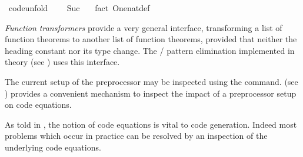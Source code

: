 \begin{isabellebody}
\begin{itemize}
\ {}code{}unfold{}{}\isanewline
\ \ {}{}\ {}\ Suc\ {}{}\ \isamarkupfalse%
\ {}fact\ One{}nat{}def{}%
\endisatagquote
{\isafoldquote}%
%
\isadelimquote
%
\endisadelimquote
%
\end{itemize}
%
\begin{isamarkuptext}%
\noindent \emph{Function transformers} provide a very general
  interface, transforming a list of function theorems to another list
  of function theorems, provided that neither the heading constant nor
  its type change.  The  /  pattern
  elimination implemented in theory \hyperlink{theory.Efficient-Nat}{\mbox{}} (see
  ) uses this interface.

  \noindent The current setup of the preprocessor may be inspected
  using the \hypertarget{command.print-codeproc}{\hyperlink{command.print-codeproc}{\mbox{}}} command.  \hypertarget{command.code-thms}{\hyperlink{command.code-thms}{\mbox{}}} (see ) provides a convenient
  mechanism to inspect the impact of a preprocessor setup on code
  equations.%
\end{isamarkuptext}%
\isamarkuptrue%
%
\isamarkuptrue%
%
\begin{isamarkuptext}%
As told in , the notion of code equations is
  vital to code generation.  Indeed most problems which occur in
  practice can be resolved by an inspection of the underlying code
  equations.


\end{isamarkuptext}
\end{isabellebody}

